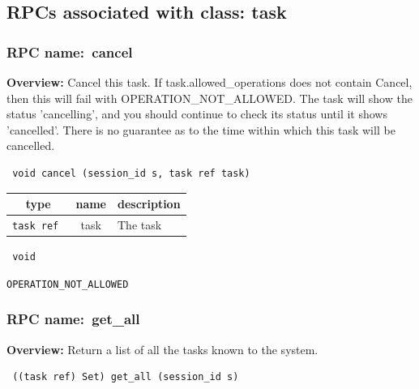 \subsection{RPCs associated with class: task}
\subsubsection{RPC name:~cancel}

{\bf Overview:} 
Cancel this task.  If task.allowed\_operations does not contain Cancel,
then this will fail with OPERATION\_NOT\_ALLOWED.  The task will show the
status 'cancelling', and you should continue to check its status until it
shows 'cancelled'.  There is no guarantee as to the time within which this
task will be cancelled.

\begin{verbatim} void cancel (session_id s, task ref task)\end{verbatim}



 
\vspace{0.3cm}
\begin{tabular}{|c|c|p{7cm}|}
 \hline
{\bf type} & {\bf name} & {\bf description} \\ \hline
{\tt task ref } & task & The task \\ \hline 

\end{tabular}

\vspace{0.3cm}

{\tt 
void
}



\vspace{0.3cm}

 {\tt OPERATION\_NOT\_ALLOWED}

\vspace{0.6cm}
\subsubsection{RPC name:~get\_all}

{\bf Overview:} 
Return a list of all the tasks known to the system.

\begin{verbatim} ((task ref) Set) get_all (session_id s)\end{verbatim}


